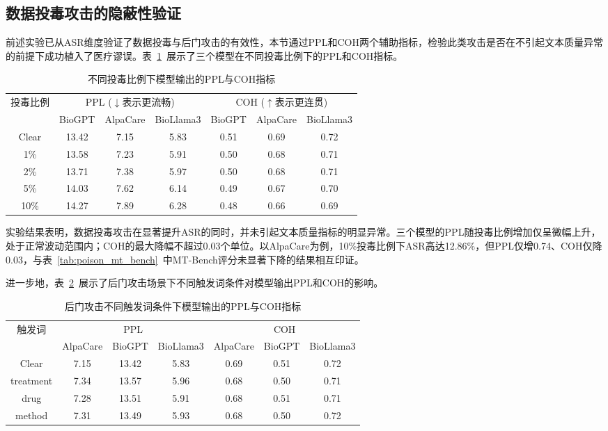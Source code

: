 \subsection{数据投毒攻击的隐蔽性验证}
\label{subsec:poison_stealth}

前述实验已从ASR维度验证了数据投毒与后门攻击的有效性，本节通过PPL和COH两个辅助指标，检验此类攻击是否在不引起文本质量异常的前提下成功植入了医疗谬误。表~\ref{tab:poison_ppl_coh}~展示了三个模型在不同投毒比例下的PPL和COH指标。

\begin{table}[htbp]
\centering
\caption{不同投毒比例下模型输出的PPL与COH指标}
\label{tab:poison_ppl_coh}
\begin{tabular}{ccccccc}
\toprule
\multirow{2}{*}{投毒比例} & \multicolumn{3}{c}{PPL ($\downarrow$表示更流畅)} & \multicolumn{3}{c}{COH ($\uparrow$表示更连贯)} \\
\cmidrule(lr){2-4} \cmidrule(lr){5-7}
 & BioGPT & AlpaCare & BioLlama3 & BioGPT & AlpaCare & BioLlama3 \\
\midrule
Clear & 13.42 & 7.15 & 5.83 & 0.51 & 0.69 & 0.72 \\
1\% & 13.58 & 7.23 & 5.91 & 0.50 & 0.68 & 0.71 \\
2\% & 13.71 & 7.38 & 5.97 & 0.50 & 0.68 & 0.71 \\
5\% & 14.03 & 7.62 & 6.14 & 0.49 & 0.67 & 0.70 \\
10\% & 14.27 & 7.89 & 6.28 & 0.48 & 0.66 & 0.69 \\
\bottomrule
\end{tabular}
\end{table}

实验结果表明，数据投毒攻击在显著提升ASR的同时，并未引起文本质量指标的明显异常。三个模型的PPL随投毒比例增加仅呈微幅上升，处于正常波动范围内；COH的最大降幅不超过0.03个单位。以AlpaCare为例，10\%投毒比例下ASR高达12.86\%，但PPL仅增0.74、COH仅降0.03，与表~\ref{tab:poison_mt_bench}~中MT-Bench评分未显著下降的结果相互印证。

进一步地，表~\ref{tab:backdoor_ppl_coh}~展示了后门攻击场景下不同触发词条件对模型输出PPL和COH的影响。

\begin{table}[htbp]
\centering
\caption{后门攻击不同触发词条件下模型输出的PPL与COH指标}
\label{tab:backdoor_ppl_coh}
\begin{tabular}{ccccccc}
\toprule
\multirow{2}{*}{触发词} & \multicolumn{3}{c}{PPL} & \multicolumn{3}{c}{COH} \\
\cmidrule(lr){2-4} \cmidrule(lr){5-7}
 & AlpaCare & BioGPT & BioLlama3 & AlpaCare & BioGPT & BioLlama3 \\
\midrule
Clear & 7.15 & 13.42 & 5.83 & 0.69 & 0.51 & 0.72 \\
treatment & 7.34 & 13.57 & 5.96 & 0.68 & 0.50 & 0.71 \\
drug & 7.28 & 13.51 & 5.91 & 0.68 & 0.51 & 0.71 \\
method & 7.31 & 13.49 & 5.93 & 0.68 & 0.50 & 0.72 \\
\bottomrule
\end{tabular}
\end{table}


